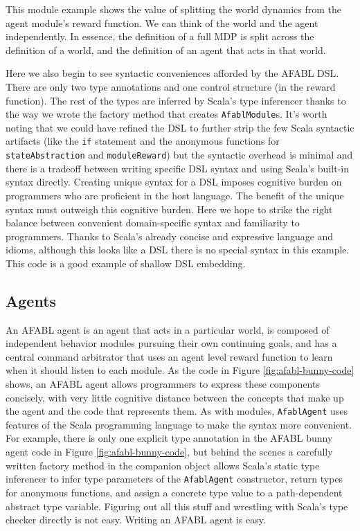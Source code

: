 This module example shows the value of splitting the world dynamics from the agent module's reward function. We can think of the world and the agent independently. In essence, the definition of a full MDP is split across the definition of a world, and the definition of an agent that acts in that world.

Here we also begin to see syntactic conveniences afforded by the AFABL DSL. There are only two type annotations and one control structure (in the reward function). The rest of the types are inferred by Scala's type inferencer thanks to the way we wrote the factory method that creates {\tt AfablModule}s. It's worth noting that we could have refined the DSL to further strip the few Scala syntactic artifacts (like the {\tt if} statement and the anonymous functions for {\tt stateAbstraction} and {\tt moduleReward}) but the syntactic overhead is minimal and there is a tradeoff between writing specific DSL syntax and using Scala's built-in syntax directly. Creating unique syntax for a DSL imposes cognitive burden on programmers who are proficient in the host language. The benefit of the unique syntax must outweigh this cognitive burden. Here we hope to strike the right balance between convenient domain-specific syntax and familiarity to programmers. Thanks to Scala's already concise and expressive language and idioms, although this looks like a DSL there is no special syntax in this example. This code is a good example of shallow DSL embedding.

\subsection{Agents}\label{sec:afabl-agents}

An AFABL agent is an agent that acts in a particular world, is composed of independent behavior modules pursuing their own continuing goals, and has a central command arbitrator that uses an agent level reward function to learn when it should listen to each module. As the code in Figure \ref{fig:afabl-bunny-code} shows, an AFABL agent allows programmers to express these components concisely, with very little cognitive distance between the concepts that make up the agent and the code that represents them. As with modules, {\tt AfablAgent} uses features of the Scala programming language to make the syntax more convenient. For example, there is only one explicit type annotation in the AFABL bunny agent code in Figure \ref{fig:afabl-bunny-code}, but behind the scenes a carefully written factory method in the companion object allows Scala's static type inferencer to infer type parameters of the {\tt AfablAgent} constructor, return types for anonymous functions, and assign a concrete type value to a path-dependent abstract type variable. Figuring out all this stuff and wrestling with Scala's type checker directly is not easy. Writing an AFABL agent is easy.

